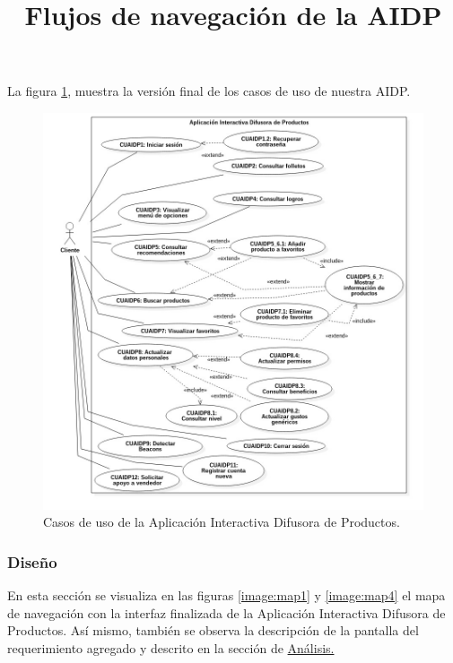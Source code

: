La figura \ref{image:casosdeusoAIDP1}, muestra la versión final de los casos de uso de nuestra AIDP.
\FloatBarrier
\begin{figure}[htbp!]
		\centering
			\includegraphics[width=1.1 \textwidth]{imagenes/Diagramas_UserApp/casosDeUsoFINALES}
		\caption{Casos de uso de la Aplicación Interactiva Difusora de Productos.}
		\label{image:casosdeusoAIDP1}
\end{figure}
\FloatBarrier

\subsubsection{Diseño}
\title{\textbf{Flujos de navegación de la AIDP}\\ \par}
En esta sección se visualiza en las figuras \ref{image:map1} y \ref{image:map4} el mapa de navegación con la interfaz finalizada de la Aplicación Interactiva Difusora de Productos. Así mismo, también se observa la descripción de la pantalla del requerimiento agregado y descrito en la sección de \hyperlink{analisis1}{Análisis.}\\ \par

